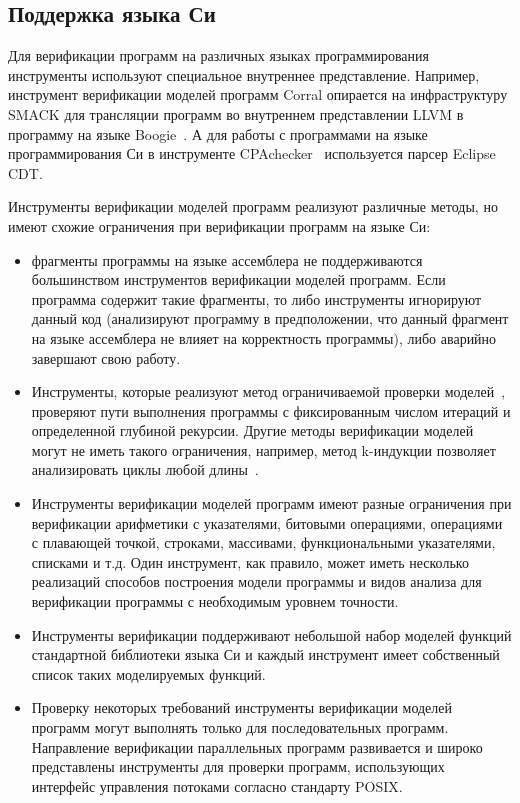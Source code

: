 \subsection{Поддержка языка Си}
Для верификации программ на различных языках программирования инструменты используют специальное внутреннее представление.
Например, инструмент верификации моделей программ Corral опирается на инфраструктуру SMACK для трансляции программ во внутреннем представлении LLVM в программу на языке Boogie~\cite{tacas2015-hcelqr}.
А для работы с программами на языке программирования Си в инструменте CPAchecker~\cite{Beyer:2011:CTC} используется парсер Eclipse CDT.

Инструменты верификации моделей программ реализуют различные методы, но имеют схожие ограничения при верификации программ на языке Си:
\begin{itemize}
    \item фрагменты программы на языке ассемблера не поддерживаются большинством инструментов верификации моделей программ. Если программа содержит такие фрагменты, то либо инструменты игнорируют данный код (анализируют программу в предположении, что данный фрагмент на языке ассемблера не влияет на корректность программы), либо аварийно завершают свою работу.
    \item Инструменты, которые реализуют метод ограничиваемой проверки моделей~\cite{Biere03boundedmodel}, проверяют пути выполнения программы с фиксированным числом итераций и определенной глубиной рекурсии. Другие методы верификации моделей могут не иметь такого ограничения, например, метод k-индукции позволяет анализировать циклы любой длины~\cite{kinduction}.
    \item Инструменты верификации моделей программ имеют разные ограничения при верификации арифметики с указателями, битовыми операциями, операциями с плавающей точкой, строками, массивами, функциональными указателями, списками и т.д. Один инструмент, как правило, может иметь несколько реализаций способов построения модели программы и видов анализа для верификации программы с необходимым уровнем точности. 
    \item Инструменты верификации поддерживают небольшой набор моделей функций стандартной библиотеки языка Си и каждый инструмент имеет собственный список таких моделируемых функций.
    \item Проверку некоторых требований инструменты верификации моделей программ могут выполнять только для последовательных программ.
    Направление верификации параллельных программ развивается и широко представлены инструменты для проверки программ, использующих интерфейс управления потоками согласно стандарту POSIX.
\end{itemize}

